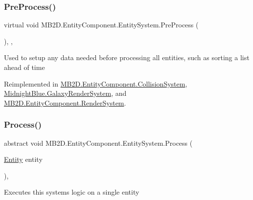 \subsubsection{\texorpdfstring{Pre\+Process()}{PreProcess()}}
{\footnotesize\ttfamily virtual void M\+B2\+D.\+Entity\+Component.\+Entity\+System.\+Pre\+Process (\begin{DoxyParamCaption}{ }\end{DoxyParamCaption})\hspace{0.3cm}{\ttfamily [inline]}, {\ttfamily [protected]}, {\ttfamily [virtual]}}



Used to setup any data needed before processing all entities, such as sorting a list ahead of time 



Reimplemented in \hyperlink{class_m_b2_d_1_1_entity_component_1_1_collision_system_ad591227767c8b6c66ca3891de04e9050}{M\+B2\+D.\+Entity\+Component.\+Collision\+System}, \hyperlink{class_midnight_blue_1_1_galaxy_render_system_a269f042fe0c55e47f3b23cc1930ed71a}{Midnight\+Blue.\+Galaxy\+Render\+System}, and \hyperlink{class_m_b2_d_1_1_entity_component_1_1_render_system_aadd36efe73a5f8cc489894232a5fc201}{M\+B2\+D.\+Entity\+Component.\+Render\+System}.

\hypertarget{class_m_b2_d_1_1_entity_component_1_1_entity_system_abbf83b87cb5d12754fb058cef50451fa}{}\label{class_m_b2_d_1_1_entity_component_1_1_entity_system_abbf83b87cb5d12754fb058cef50451fa} 
\subsubsection{\texorpdfstring{Process()}{Process()}}
{\footnotesize\ttfamily abstract void M\+B2\+D.\+Entity\+Component.\+Entity\+System.\+Process (\begin{DoxyParamCaption}\item[{\hyperlink{class_m_b2_d_1_1_entity_component_1_1_entity}{Entity}}]{entity }\end{DoxyParamCaption})\hspace{0.3cm}{\ttfamily [protected]}, {}}



Executes this systems logic on a single entity 


